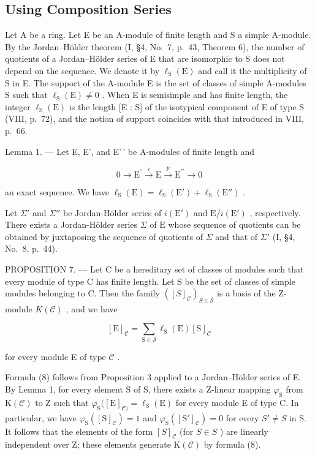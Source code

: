 \subsection{Using Composition Series}

Let A be a ring. Let E be an A-module of finite length and S a simple A-module. By the Jordan--Hölder theorem (I, §4, No.~7, p.~43, Theorem 6), the number of quotients of a Jordan--Hölder series of E that are isomorphic to S does not depend on the sequence. We denote it by \(\ell_{\mathrm{S}}(\mathrm{E})\) and call it the multiplicity of S in E. The support of the A-module E is the set of classes of simple A-modules S such that \(\ell_{\mathrm{S}}(\mathrm{E}) \neq 0\) . When E is semisimple and has finite length, the integer \(\ell_{\mathrm{S}}(\mathrm{E})\) is the length {[}E : S{]} of the isotypical component of E of type S (VIII, p.~72), and the notion of support coincides with that introduced in VIII, p.~66.

Lemma 1. --- Let E, E', and E'\,' be A-modules of finite length and

\[
0 \longrightarrow \mathrm{E} ^ {\prime} \stackrel {i} {\longrightarrow} \mathrm{E} \stackrel {p} {\longrightarrow} \mathrm{E} ^ {\prime \prime} \longrightarrow 0
\]

an exact sequence. We have \(\ell_{\mathrm{S}}(\mathrm{E}) = \ell_{\mathrm{S}}(\mathrm{E}') + \ell_{\mathrm{S}}(\mathrm{E}'')\) .

Let \(\Sigma'\) and \(\Sigma''\) be Jordan-Hölder series of \(i(\mathrm{E}')\) and \(\mathrm{E}/i(\mathrm{E}')\) , respectively. There exists a Jordan-Hölder series \(\Sigma\) of \(\mathrm{E}\) whose sequence of quotients can be obtained by juxtaposing the sequence of quotients of \(\Sigma\) and that of \(\Sigma'\) (I, §4, No.~8, p.~44).

PROPOSITION 7. --- Let C be a hereditary set of classes of modules such that every module of type C has finite length. Let S be the set of classes of simple modules belonging to C. Then the family \(([S]_{\mathcal{C}})_{S \in \mathcal{S}}\) is a basis of the Z-module \(K(\mathcal{C})\) , and we have

\[
[ \mathrm{E} ] _ {\mathcal {C}} = \sum_ {\mathrm{S} \in \mathcal {S}} \ell_ {\mathrm{S}} (\mathrm{E}) [ \mathrm{S} ] _ {\mathcal {C}}\tag{8}
\]

for every module E of type \(\mathcal{C}\) .

Formula (8) follows from Proposition 3 applied to a Jordan--Hölder series of E. By Lemma 1, for every element S of S, there exists a Z-linear mapping \(\varphi_{\mathrm{S}}\) from \(\mathrm{K}(\mathcal{C})\) to Z such that \(\varphi_{\mathrm{S}}([\mathrm{E}]_{\mathcal{C})} = \ell_{\mathrm{S}}(\mathrm{E})\) for every module E of type C. In particular, we have \(\varphi_{\mathrm{S}}([\mathrm{S}]_{\mathcal{C}}) = 1\) and \(\varphi_{\mathrm{S}}([\mathrm{S}']_{\mathcal{C}}) = 0\) for every \(S' \neq S\) in S. It follows that the elements of the form \([S]_{\mathcal{C}}\) (for \(S \in S\) ) are linearly independent over Z; these elements generate \(\mathrm{K}(\mathcal{C})\) by formula (8).

